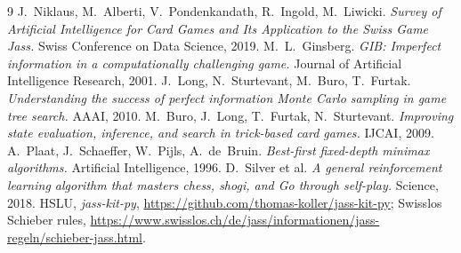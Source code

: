 \documentclass[10pt,a4paper]{article}
\begin{document}
\begin{thebibliography}{9}\small\setlength{\itemsep}{1pt}\setlength{\parskip}{0pt}
 J.~Niklaus, M.~Alberti, V.~Pondenkandath, R.~Ingold, M.~Liwicki. \emph{Survey of Artificial
  Intelligence for Card Games and Its Application to the Swiss Game Jass.} Swiss Conference on Data Science, 2019.
 M.~L.~Ginsberg. \emph{GIB: Imperfect information in a computationally challenging game.} Journal of
  Artificial Intelligence Research, 2001.
 J.~Long, N.~Sturtevant, M.~Buro, T.~Furtak. \emph{Understanding the success of perfect information
  Monte Carlo sampling in game tree search.} AAAI, 2010.
 M.~Buro, J.~Long, T.~Furtak, N.~Sturtevant. \emph{Improving state evaluation, inference, and search in
  trick-based card games.} IJCAI, 2009.
 A.~Plaat, J.~Schaeffer, W.~Pijls, A.~de~Bruin. \emph{Best-first fixed-depth minimax algorithms.}
  Artificial Intelligence, 1996.
 D.~Silver et al. \emph{A general reinforcement learning algorithm that masters chess, shogi, and
  Go through self-play.} Science, 2018.
 HSLU, \emph{jass-kit-py}, \url{https://github.com/thomas-koller/jass-kit-py};
  Swisslos Schieber rules, \url{https://www.swisslos.ch/de/jass/informationen/jass-regeln/schieber-jass.html}.
\end{thebibliography}
\end{document}
